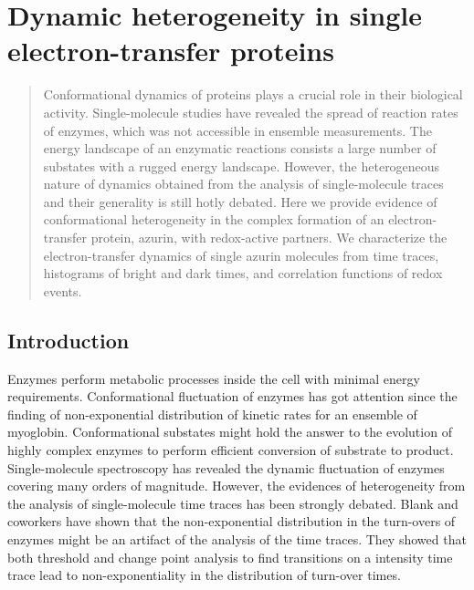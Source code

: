 \chapter{Dynamic heterogeneity in single electron-transfer proteins}
\label{chapter:azurin}
\graphicspath{{./chapters/c4_azurin_sm/main/}}
\begin{abstract}
	Conformational dynamics of proteins plays a crucial role in their biological activity. Single-molecule studies have revealed the spread of reaction rates of enzymes, which was not accessible in ensemble measurements.
	The energy landscape of an enzymatic reactions consists a large number of substates with a rugged energy landscape.
	However, the heterogeneous nature of dynamics obtained from the analysis of single-molecule traces and their generality is still hotly debated.
	Here we provide evidence of conformational heterogeneity in the complex formation of an electron-transfer protein, azurin, with redox-active partners.
	We characterize the electron-transfer dynamics of single azurin molecules from time traces, histograms of bright and dark times, and correlation functions of redox events. 
\end{abstract}
\newpage
\section{Introduction}
Enzymes perform metabolic processes inside the cell with minimal energy requirements.
Conformational fluctuation of enzymes has got attention since the finding of non-exponential distribution of kinetic rates for an ensemble of myoglobin. \cite{frauenfelder1991the,ansari1985protein,stein1985a,henzler-wildman2007dynamic}
Conformational substates might hold the answer to the evolution of highly complex enzymes to perform efficient conversion of substrate to product.
Single-molecule spectroscopy has revealed the dynamic fluctuation of enzymes covering many orders of magnitude.\cite{lu1998single-molecule,yang2003protein,english2006ever-fluctuating}
However, the evidences of heterogeneity from the analysis of single-molecule time traces has been strongly debated.
Blank and coworkers have shown that the non-exponential distribution in the turn-overs of enzymes might be an artifact of the analysis of the time traces.\cite{terentyeva2012dynamic}
They showed that both threshold and change point analysis to find transitions on a intensity time trace lead to non-exponentiality in the distribution of turn-over times.


